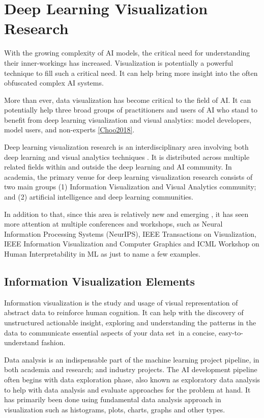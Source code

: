 \section{Deep Learning Visualization Research}

With the growing complexity of AI models, the critical need for understanding their inner-workings has increased. Visualization is potentially a powerful technique to fill such a critical need. It can help bring more insight into the often obfuscated complex AI systems.

More than ever, data visualization has become critical to the field of AI. It can potentially help three broad groups of practitioners and users of AI who stand to benefit from deep learning visualization and visual analytics: model developers, model users, and non-experts \ref{Choo2018}.

Deep learning visualization research is an interdisciplinary area involving both deep learning and visual analytics techniques \cite{Choo2018}. It is distributed across multiple related fields within and outside the deep learning and AI community. In academia, the primary venue for deep learning visualization research consists of two main groups (1) Information Visualization and Visual Analytics community; and (2) artificial intelligence and deep learning communities. 

In addition to that, since this area is relatively new and emerging \cite{Choo2018}, it has seen more attention at multiple conferences and workshops, such as Neural Information Processing Systems (NeurIPS), IEEE Transactions on Visualization, IEEE Information Visualization and Computer Graphics and ICML Workshop on Human Interpretability in ML as just to name a few examples.

\subsection{Information Visualization Elements}

Information visualization is the study and usage of visual representation of abstract data to reinforce human cognition. It can help with the discovery of unstructured actionable insight, exploring and understanding the patterns in the data to communicate essential aspects of your data set in a concise, easy-to-understand fashion.

Data analysis is an indispensable part of the machine learning project pipeline, in both academia and research; and industry projects. The AI development pipeline often begins with data exploration phase, also known as exploratory data analysis to help with data analysis and evaluate approaches for the problem at hand. It has primarily been done using fundamental data analysis approach in visualization such as histograms, plots, charts, graphs and other types.

